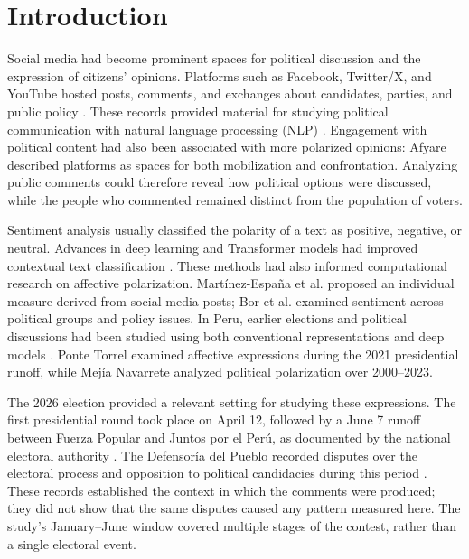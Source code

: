 \documentclass[conference,letterpaper]{IEEEtran}
\begin{document}
\section{Introduction}

Social media had become prominent spaces for political discussion and the expression of citizens' opinions. 
Platforms such as Facebook, Twitter/X, and YouTube hosted posts, comments, and exchanges about candidates, 
parties, and public policy \cite{statista2026}. These records provided material for studying political 
communication with natural language processing (NLP) \cite{ref1}. Engagement with political content had also 
been associated with more polarized opinions: Afyare \cite{afyare2025socialmedia} described platforms as spaces 
for both mobilization and confrontation. Analyzing public comments could therefore reveal how political options 
were discussed, while the people who commented remained distinct from the population of voters.

Sentiment analysis usually classified the polarity of a text as positive, negative, or neutral. Advances in 
deep learning and Transformer models had improved contextual text classification \cite{Singh2026}. These 
methods had also informed computational research on affective polarization. Martínez-España et al. \cite{polariz} proposed an individual measure derived from social media posts; Bor et al. \cite{bor2023} examined sentiment across political groups and policy issues. In Peru, earlier elections and political discussions had been studied using both conventional representations and deep models \cite{Ayma2024,Carrera2026}. Ponte Torrel \cite{Ponte2022} examined affective expressions during the 2021 presidential runoff, while Mejía Navarrete \cite{Mejia2024} analyzed political polarization over 2000--2023.

The 2026 election provided a relevant setting for studying these expressions. The first presidential round took place on April 12, followed by a June 7 runoff between Fuerza Popular and Juntos por el Perú, as documented by the national electoral authority \cite{JNE11352026}. The Defensoría del Pueblo recorded disputes over the electoral process and opposition to political candidacies during this period \cite{Defensoria2842026}. These records established the context in which the comments were produced; they did not show that the same disputes caused any pattern measured here. The study's January--June window covered multiple stages of the contest, rather than a single electoral event.
\end{document}
